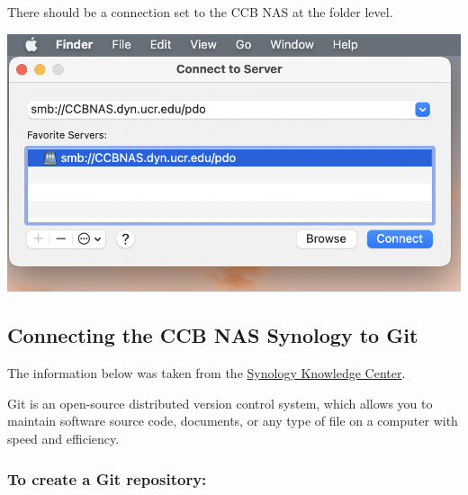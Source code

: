 \documentclass[
]{book}
\begin{document}
There should be a connection set to the CCB NAS at the folder level.

\begin{flushleft}\includegraphics[width=0.5\linewidth]{images/nas_mac} \end{flushleft}

\hypertarget{connecting-the-ccb-nas-synology-to-git}{%
\subsection{Connecting the CCB NAS Synology to Git}\label{connecting-the-ccb-nas-synology-to-git}}

The information below was taken from the \href{https://kb.synology.com/en-sg/DSM/help/Git/git?version=7}{Synology Knowledge Center}.

Git is an open-source distributed version control system, which allows you to maintain software source code, documents, or any type of file on a computer with speed and efficiency.

\hypertarget{to-create-a-git-repository}{%
\subsubsection{To create a Git repository:}\label{to-create-a-git-repository}}
\end{document}
